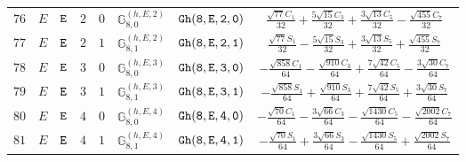 \documentclass[fleqn,8pt]{jsarticle}
\begin{document}
\begin{table}[ht!]
\begin{center}
\begin{tabular}{cccccccc}
$ 76 $ & $ E $ & $ {\tt E} $ & $ 2 $ & $ 0 $ & $ \mathbb{G}_{8,0}^{(h,E,2)} $ & $ {\tt Gh(8,E,2,0)} $ & $ \frac{\sqrt{77} C_{1}}{32} + \frac{5 \sqrt{15} C_{3}}{32} + \frac{3 \sqrt{13} C_{5}}{32} - \frac{\sqrt{455} C_{7}}{32} $ \\
$ 77 $ & $ E $ & $ {\tt E} $ & $ 2 $ & $ 1 $ & $ \mathbb{G}_{8,1}^{(h,E,2)} $ & $ {\tt Gh(8,E,2,1)} $ & $ \frac{\sqrt{77} S_{1}}{32} - \frac{5 \sqrt{15} S_{3}}{32} + \frac{3 \sqrt{13} S_{5}}{32} + \frac{\sqrt{455} S_{7}}{32} $ \\
$ 78 $ & $ E $ & $ {\tt E} $ & $ 3 $ & $ 0 $ & $ \mathbb{G}_{8,0}^{(h,E,3)} $ & $ {\tt Gh(8,E,3,0)} $ & $ - \frac{\sqrt{858} C_{1}}{64} - \frac{\sqrt{910} C_{3}}{64} + \frac{7 \sqrt{42} C_{5}}{64} - \frac{3 \sqrt{30} C_{7}}{64} $ \\
$ 79 $ & $ E $ & $ {\tt E} $ & $ 3 $ & $ 1 $ & $ \mathbb{G}_{8,1}^{(h,E,3)} $ & $ {\tt Gh(8,E,3,1)} $ & $ - \frac{\sqrt{858} S_{1}}{64} + \frac{\sqrt{910} S_{3}}{64} + \frac{7 \sqrt{42} S_{5}}{64} + \frac{3 \sqrt{30} S_{7}}{64} $ \\
$ 80 $ & $ E $ & $ {\tt E} $ & $ 4 $ & $ 0 $ & $ \mathbb{G}_{8,0}^{(h,E,4)} $ & $ {\tt Gh(8,E,4,0)} $ & $ - \frac{\sqrt{70} C_{1}}{64} - \frac{3 \sqrt{66} C_{3}}{64} - \frac{\sqrt{1430} C_{5}}{64} - \frac{\sqrt{2002} C_{7}}{64} $ \\
$ 81 $ & $ E $ & $ {\tt E} $ & $ 4 $ & $ 1 $ & $ \mathbb{G}_{8,1}^{(h,E,4)} $ & $ {\tt Gh(8,E,4,1)} $ & $ - \frac{\sqrt{70} S_{1}}{64} + \frac{3 \sqrt{66} S_{3}}{64} - \frac{\sqrt{1430} S_{5}}{64} + \frac{\sqrt{2002} S_{7}}{64} $ \\
 \hline \hline
\end{tabular}
\end{center}
\end{table}
\end{document}
